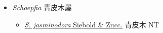 
  \begin{itemize}
 \item[] \textit{Schoepfia} 青皮木屬
                                
  \begin{itemize}
        \item[] \href{http://www.theplantlist.org/tpl1.1/search?q=Schoepfia+jasminodora}{\textit{S. jasminodora} Siebold \& Zucc.}   青皮木   NT
  \end{itemize}
  \end{itemize}
